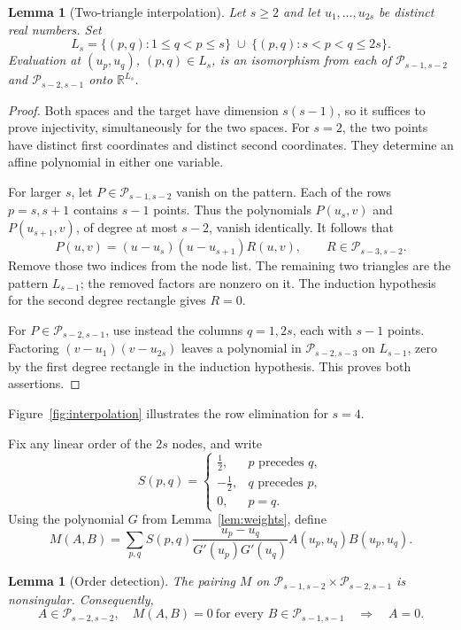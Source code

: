 \documentclass[11pt,a4paper]{article}
\newtheorem{lemma}[theorem]{Lemma}
\theoremstyle{remark}
\numberwithin{equation}{section}
\newcommand{\R}{\mathbb R}
\newcommand{\PP}{\mathcal P}
\begin{document}
\begin{lemma}[Two-triangle interpolation]\label{lem:triangles}
Let \(s\ge2\) and let \(u_1,\ldots,u_{2s}\) be distinct real numbers.
Set
\[
L_s=\{(p,q):1\le q<p\le s\}
\;\cup\;\{(p,q):s<p<q\le2s\}.
\]
Evaluation at \((u_p,u_q)\), \((p,q)\in L_s\), is an isomorphism
from each of \(\PP_{s-1,s-2}\) and \(\PP_{s-2,s-1}\) onto
\(\R^{L_s}\).
\end{lemma}

\begin{proof}
Both spaces and the target have dimension \(s(s-1)\), so it suffices
to prove injectivity, simultaneously for the two spaces.
For \(s=2\), the two points have distinct first coordinates and
distinct second coordinates. They determine an affine polynomial
in either one variable.

For larger \(s\), let \(P\in\PP_{s-1,s-2}\) vanish on the pattern.
Each of the rows \(p=s,s+1\) contains \(s-1\) points. Thus the
polynomials \(P(u_s,v)\) and \(P(u_{s+1},v)\), of degree at most
\(s-2\), vanish identically. It follows that
\[
P(u,v)=(u-u_s)(u-u_{s+1})R(u,v),
\qquad R\in\PP_{s-3,s-2}.
\]
Remove those two indices from the node list. The remaining two
triangles are the pattern \(L_{s-1}\); the removed factors are
nonzero on it. The induction hypothesis for the second degree
rectangle gives \(R=0\).

For \(P\in\PP_{s-2,s-1}\), use instead the columns \(q=1,2s\),
each with \(s-1\) points. Factoring
\((v-u_1)(v-u_{2s})\) leaves a polynomial in \(\PP_{s-2,s-3}\)
on \(L_{s-1}\), zero by the first degree rectangle in the
induction hypothesis. This proves both assertions.
\end{proof}

Figure~\ref{fig:interpolation} illustrates the row elimination for \(s=4\).


Fix any linear order of the \(2s\) nodes, and write
\[
S(p,q)=
\begin{cases}
\tfrac12,&p\text{ precedes }q,\\
-\tfrac12,&q\text{ precedes }p,\\
0,&p=q.
\end{cases}
\]
Using the polynomial \(G\) from Lemma~\ref{lem:weights}, define
\begin{equation}\label{eq:M}
M(A,B)=\sum_{p,q}
S(p,q)\frac{u_p-u_q}{G'(u_p)G'(u_q)}
A(u_p,u_q)B(u_p,u_q).
\end{equation}

\begin{lemma}[Order detection]\label{lem:detector}
The pairing \(M\) on
\(\PP_{s-1,s-2}\times\PP_{s-2,s-1}\) is nonsingular.
Consequently,
\begin{equation}\label{eq:detector}
A\in\PP_{s-2,s-2},\quad
M(A,B)=0\ \text{for every }B\in\PP_{s-1,s-1}
\quad\Longrightarrow\quad A=0.
\end{equation}
\end{lemma}
\end{document}
